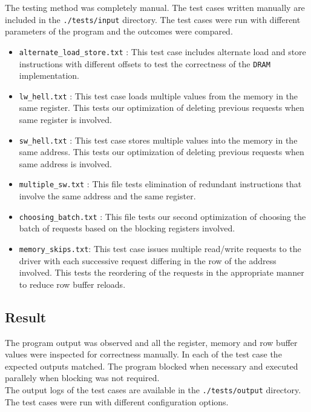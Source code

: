 \documentclass[hidelinks,12pt]{article}
\begin{document}
The testing method was completely manual. The test cases written manually are included in the \verb|./tests/input| directory. The test cases were run with different parameters
of the program and the outcomes were compared.
\begin{itemize}
    \item \verb|alternate_load_store.txt| : This test case includes alternate load and store instructions with different offsets to test the correctness of the \verb|DRAM| implementation.
    \item \verb|lw_hell.txt| : This test case loads multiple values from the memory in the same register. This tests our optimization of deleting previous requests when same register is involved.
    \item \verb|sw_hell.txt| : This test case stores multiple values into the memory in the same address. This tests our optimization of deleting previous requests when same address is involved.
    \item \verb|multiple_sw.txt| : This file tests elimination of redundant instructions that involve the same address and the same register.
    \item \verb|choosing_batch.txt| : This file tests our second optimization of choosing the batch of requests based on the blocking registers involved.
    \item \verb|memory_skips.txt|: This test case issues multiple read/write requests to the driver with each successive request differing in the row of the address involved. This tests the reordering of the requests in the appropriate manner to reduce row buffer reloads.
\end{itemize}

\subsection{Result}
The program output was observed and all the register, memory and row buffer values were inspected for correctness manually. In each of the test case the expected outputs matched. The program blocked when necessary and executed parallely when blocking was not required.\\[0.2cm]
The output logs of the test cases are available in the \verb|./tests/output| directory. The test cases were run with different configuration options.
\end{document}
